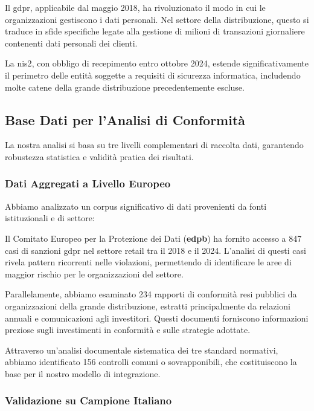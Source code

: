 Il \gls{gdpr}, applicabile dal maggio 2018, ha rivoluzionato il modo in cui le organizzazioni gestiscono i dati personali. Nel settore della distribuzione, questo si traduce in sfide specifiche legate alla gestione di milioni di transazioni giornaliere contenenti dati personali dei clienti.

La \gls{nis2}, con obbligo di recepimento entro ottobre 2024, estende significativamente il perimetro delle entità soggette a requisiti di sicurezza informatica, includendo molte catene della grande distribuzione precedentemente escluse.

\subsection{\texorpdfstring{Base Dati per l'Analisi di Conformità}{4.2.2 - Base Dati per l'Analisi di Conformità}}
\label{subsec:4.2.2_base_dati}

La nostra analisi si basa su tre livelli complementari di raccolta dati, garantendo robustezza statistica e validità pratica dei risultati.

\subsubsection{\texorpdfstring{Dati Aggregati a Livello Europeo}{4.2.2.1 - Dati Aggregati a Livello Europeo}}

Abbiamo analizzato un corpus significativo di dati provenienti da fonti istituzionali e di settore:

Il Comitato Europeo per la Protezione dei Dati (\textbf{\gls{edpb}}) ha fornito accesso a 847 casi di sanzioni \gls{gdpr} nel settore retail tra il 2018 e il 2024\autocite{EDPB2024}. L'analisi di questi casi rivela pattern ricorrenti nelle violazioni, permettendo di identificare le aree di maggior rischio per le organizzazioni del settore.

Parallelamente, abbiamo esaminato 234 rapporti di conformità resi pubblici da organizzazioni della grande distribuzione, estratti principalmente da relazioni annuali e comunicazioni agli investitori. Questi documenti forniscono informazioni preziose sugli investimenti in conformità e sulle strategie adottate.

Attraverso un'analisi documentale sistematica dei tre standard normativi, abbiamo identificato 156 controlli comuni o sovrapponibili, che costituiscono la base per il nostro modello di integrazione.

\subsubsection{\texorpdfstring{Validazione su Campione Italiano}{4.2.2.2 - Validazione su Campione Italiano}}

